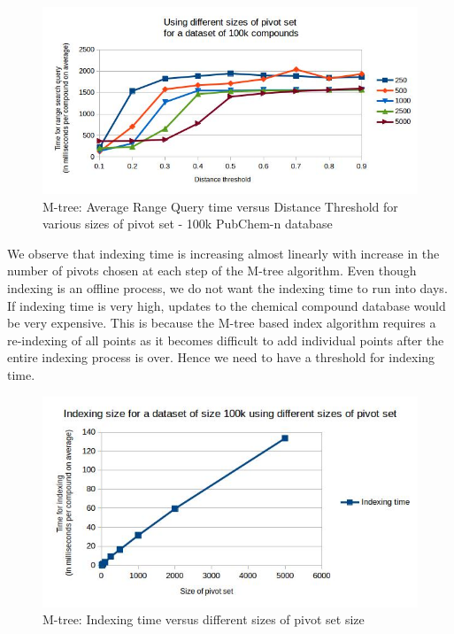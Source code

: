\begin{figure}[ht!]	
\centering
\includegraphics[width=1 \columnwidth]{img/image4.jpg}
\caption{M-tree: Average Range Query time versus Distance Threshold for various sizes of pivot set - 100k PubChem-n database}
\label{fig:5.5}
\end{figure}


We observe that indexing time is increasing almost linearly with increase in the number of pivots chosen at each step of the M-tree algorithm. Even though indexing is an offline process, we do not want the indexing time to run into days. If indexing time is very high, updates to the chemical compound database would be very expensive. This is because the M-tree based index algorithm requires a re-indexing of all points as it becomes difficult to add individual points after the entire indexing process is over. Hence we need to have a threshold for indexing time.

\begin{figure}[ht!]	
\centering
\includegraphics[width=1 \columnwidth]{img/image7.jpg}
\caption{M-tree: Indexing time versus different sizes of pivot set size}
\label{fig:5.6}
\end{figure}



